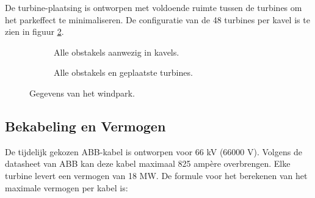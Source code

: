 De turbine-plaatsing is ontworpen met voldoende ruimte tussen de turbines om het parkeffect te minimaliseren. De configuratie van de 48 turbines per kavel is te zien in figuur \ref{fig:windparkturbines}.
\begin{figure}[h]
    \centering
    \begin{subfigure}{0.5\textwidth}
        \centering
        \setlength{\fboxsep}{0pt}  %
    \colorbox{darkgray}{}
        \caption{Alle obstakels aanwezig in kavels.}
        \label{fig:windparkitems}
    \end{subfigure}%
    \begin{subfigure}{0.5\textwidth}
        \centering
        \setlength{\fboxsep}{0pt}  %
    \colorbox{darkgray}{}
        \caption{Alle obstakels en geplaatste turbines.}
        \label{fig:windparkturbines}
    \end{subfigure}
    \caption{Gegevens van het windpark.}
    \label{fig:windpark}
\end{figure}


\subsection{Bekabeling en Vermogen}
De tijdelijk gekozen ABB-kabel is ontworpen voor 66 kV (66000 V). Volgens de datasheet van ABB kan deze kabel maximaal 825 ampère overbrengen.\cite{Kabel_ABB} Elke turbine levert een vermogen van 18 MW. De formule voor het berekenen van het maximale vermogen per kabel is:

